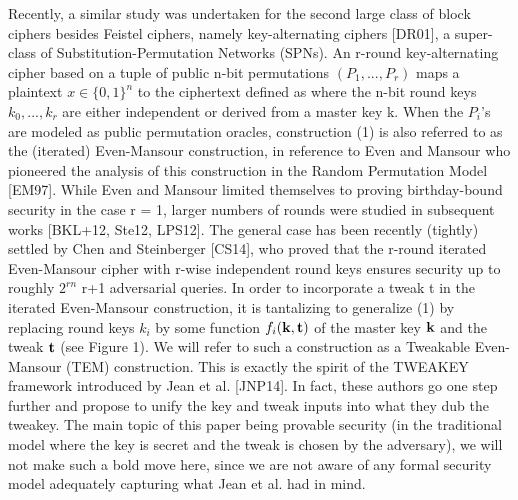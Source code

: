 \medskip{}
Recently, a similar study
was undertaken for the second large class of block ciphers besides Feistel ciphers, namely
key-alternating ciphers [DR01], a super-class of Substitution-Permutation Networks (SPNs).
An r-round key-alternating cipher based on a tuple of public n-bit permutations $(P_1, . . . , P_r)$
maps a plaintext $x\in\{0,1\}^n$ to the ciphertext defined as
%
%
%
%
%
where the n-bit round keys $k_0, . . . , k_r$ are either independent or derived from a master key k.
When the $P_i$'s are modeled as public permutation oracles, construction (1) is also referred to
as the (iterated) Even-Mansour construction, in reference to Even and Mansour who pioneered
the analysis of this construction in the Random Permutation Model [EM97]. While Even
and Mansour limited themselves to proving birthday-bound security in the case r = 1, larger
numbers of rounds were studied in subsequent works [BKL+12, Ste12, LPS12]. The general
case has been recently (tightly) settled by Chen and Steinberger [CS14], who proved that the
r-round iterated Even-Mansour cipher with r-wise independent round keys ensures security
up to roughly $2^{rn}$
r+1 adversarial queries.
In order to incorporate a tweak t in the iterated Even-Mansour construction, it is tantalizing
to generalize (1) by replacing round keys $k_i$ by some function $f_i(\mathbf{k},\mathbf{t})$ of the master key $\mathbf{k}$ and
the tweak $\mathbf{t}$ (see Figure 1). We will refer to such a construction as a Tweakable Even-Mansour
(TEM) construction. This is exactly the spirit of the TWEAKEY framework introduced by
Jean et al. [JNP14]. In fact, these authors go one step further and propose to unify the key
and tweak inputs into what they dub the tweakey. The main topic of this paper being provable
security (in the traditional model where the key is secret and the tweak is chosen by the
adversary), we will not make such a bold move here, since we are not aware of any formal
security model adequately capturing what Jean et al. had in mind.



